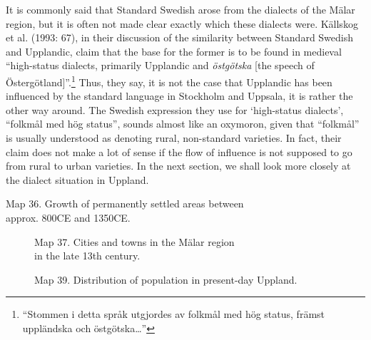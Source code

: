 It is commonly said that Standard Swedish arose from the dialects of the Mälar region, but it is often not made clear exactly which these dialects were. Källskog et al. (1993: 67), in their discussion of the similarity between Standard Swedish and Upplandic, claim that the base for the former is to be found in medieval “high-status dialects, primarily Upplandic and \textit{östgötska} [the speech of Östergötland]”.\footnote{ “Stommen i detta språk utgjordes av folkmål med hög status, främst uppländska och östgötska…”} Thus, they say, it is not the case that Upplandic has been influenced by the standard language in Stockholm and Uppsala, it is rather the other way around. The Swedish expression they use for ‘high-status dialects’, “folkmål med hög status”, sounds almost like an oxymoron, given that “folkmål” is usually understood as denoting rural, non-standard varieties. In fact, their claim does not make a lot of sense if the flow of influence is not supposed to go from rural to urban varieties. In the next section, we shall look more closely at the dialect situation in Uppland.


Map 36. Growth of permanently  settled areas between\\
approx. 800CE and 1350CE.


\begin{figure}[h]

\begin{minipage}{3.04167in}

\label{bkm:Ref177899651}Map 37. Cities and towns in the Mälar region\\
 in the late 13th century.


\end{minipage}

\end{figure}

\begin{figure}[h]

\begin{minipage}{2.64583in}

\label{bkm:Ref151801116}Map 39. Distribution of population in present-day Uppland.


\end{minipage}

\end{figure}

